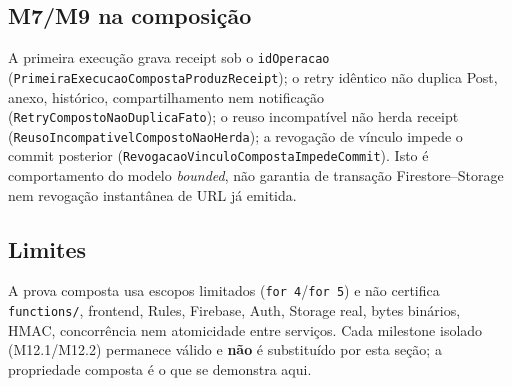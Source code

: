 \subsection*{M7/M9 na composição}
A primeira execução grava receipt sob o \texttt{idOperacao}
(\texttt{PrimeiraExecucaoCompostaProduzReceipt}); o retry idêntico não duplica
Post, anexo, histórico, compartilhamento nem notificação
(\texttt{RetryCompostoNaoDuplicaFato}); o reuso incompatível não herda receipt
(\texttt{ReusoIncompativelCompostoNaoHerda}); a revogação de vínculo impede o
commit posterior (\texttt{RevogacaoVinculoCompostaImpedeCommit}). Isto é
comportamento do modelo \emph{bounded}, não garantia de transação
Firestore--Storage nem revogação instantânea de URL já emitida.

\begingroup\small\raggedright

\par\endgroup

\subsection*{Limites}
A prova composta usa escopos limitados (\texttt{for 4}/\texttt{for 5}) e não
certifica \texttt{functions/}, frontend, Rules, Firebase, Auth, Storage real,
bytes binários, HMAC, concorrência nem atomicidade entre serviços. Cada milestone
isolado (M12.1/M12.2) permanece válido e \textbf{não} é substituído por esta
seção; a propriedade composta é o que se demonstra aqui.
\fussy
